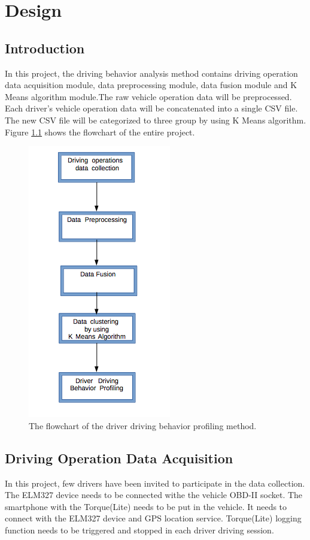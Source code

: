 \chapter{Design}
\section{Introduction}
In this project, the driving behavior analysis method contains driving operation data acquisition module, data preprocessing module, data fusion module and K Means algorithm module.The raw vehicle operation data will be preprocessed. Each driver's vehicle operation data will be concatenated into a single CSV file. The new CSV file will be categorized to three group by using K Means algorithm. Figure \ref{fig:projectflow} shows the flowchart of the entire project.

\begin{figure}[hbt!]\centering
\includegraphics[height=.4\textheight]{image/flowchart}
\caption{The flowchart of the driver driving behavior profiling method. }
\label{fig:projectflow}
\end{figure}

\section{Driving Operation Data Acquisition}
In this project, few drivers have been invited to participate in the data collection. The ELM327 device needs to be connected withe the vehicle OBD-II socket. The smartphone with the Torque(Lite) needs to be put in the vehicle. It needs to connect with the ELM327 device and GPS location service. Torque(Lite) logging function needs to be triggered and stopped in each driver driving session. 


